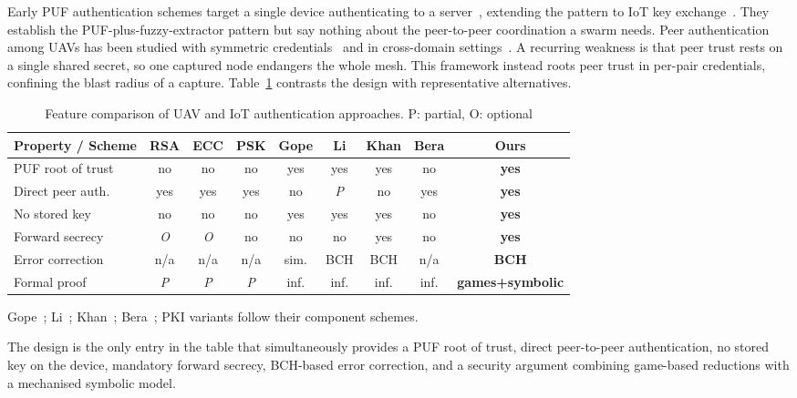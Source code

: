 \documentclass[journal]{IEEEtran}
\begin{document}
Early PUF authentication schemes target a single device authenticating to a
server~\cite{puf_lightweight_uav,puf_iot_strong_adversary,arbiter_puf_iot},
extending the pattern to IoT key exchange~\cite{puf_key_exchange}.
They establish the PUF-plus-fuzzy-extractor pattern but say nothing about the
peer-to-peer coordination a swarm needs. Peer authentication among UAVs has
been studied with symmetric credentials~\cite{peer2peer_auth} and in
cross-domain settings~\cite{puf_uav_cross_domain,puf_6g_uav}. A recurring
weakness is that peer trust rests on a single shared secret, so one captured
node endangers the whole mesh. This framework instead roots peer trust in
per-pair credentials, confining the blast radius of a capture. Table~\ref{tab:related}
contrasts the design with representative alternatives.

\begin{table}[H]
\centering
\caption{Feature comparison of UAV and IoT authentication approaches.
P: partial, O: optional}
\label{tab:related}
\scriptsize
\setlength{\tabcolsep}{2.2pt}
\begin{tabular}{@{}lcccccccc@{}}
\toprule
\textbf{Property / Scheme} & \textbf{RSA} & \textbf{ECC} & \textbf{PSK} &
\textbf{Gope} & \textbf{Li} & \textbf{Khan} & \textbf{Bera} & \textbf{Ours} \\
\midrule
PUF root of trust & no  & no  & no  & yes & yes & yes & no  & \textbf{yes} \\
Direct peer auth. & yes & yes & yes & no  & \emph{P} & no  & yes & \textbf{yes} \\
No stored key     & no  & no  & no  & yes & yes & yes & no  & \textbf{yes} \\
Forward secrecy   & \emph{O} & \emph{O} & no  & no  & no  & yes & no  & \textbf{yes} \\
Error correction  & n/a & n/a & n/a & sim. & BCH & BCH & n/a & \textbf{BCH} \\
Formal proof      & \emph{P} & \emph{P} & \emph{P} & inf. & inf. & inf. & inf. & \textbf{games+symbolic} \\
\bottomrule
\end{tabular}

\vspace{2pt}
\raggedright\tiny
Gope~\cite{puf_lightweight_uav}; Li~\cite{puf_uav_cross_domain};
Khan~\cite{puf_6g_uav}; Bera~\cite{peer2peer_auth}; PKI variants follow their
component schemes.
\end{table}

The design is the only entry in the table that simultaneously provides a PUF
root of trust, direct peer-to-peer authentication, no stored key on the device,
mandatory forward secrecy, BCH-based error correction, and a security argument
combining game-based reductions with a mechanised symbolic model.
\end{document}
